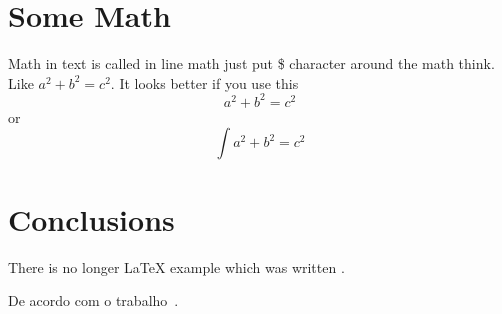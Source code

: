 \documentclass[12pt, a4paper, twoside, titlepage]{article}
\begin{document}
 \section{Some Math}
 Math in text is called in line math just put \$ character around 
 the math think. Like $ a^2 + b^2 = c^2 $. It looks better if you use this 
 $$a^2 + b^2 = c^2$$
 or
 \begin{equation}
 \int a^2 + b^2 = c^2
 \end{equation}

\section{Conclusions}
\label{conclusions}
There is no longer \LaTeX{} example which was written \cite{Silveira2012a}.

De acordo com o trabalho~\cite{stroustrup2013}.



\end{document}
